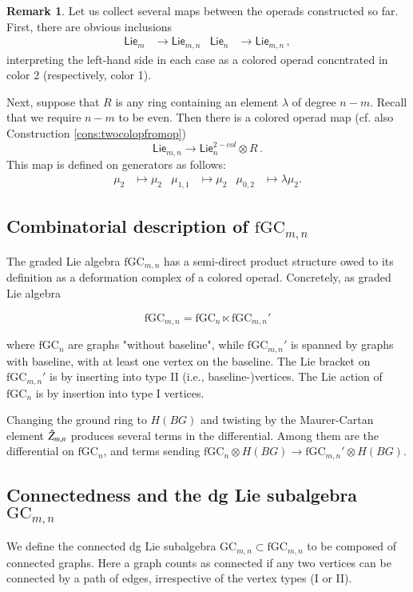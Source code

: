 \documentclass[a4paper]{amsart}
\theoremstyle{plain}
\theoremstyle{definition}
\newtheorem{rem}[thm]{Remark}
\newcommand{\Lie}{\mathsf{Lie}}
\newcommand{\GC}{\mathrm{GC}}
\newcommand{\fGC}{\mathrm{fGC}}
\newcommand{\beq}[1]{
\begin{equation}\label{#1}
}
\newcommand{\eeq}{
\end{equation}
}
\begin{document}
\begin{rem}
 Let us collect several maps between the operads constructed so far.
First, there are obvious inclusions 
\begin{align}\label{equ:Liemninclusions}
 \Lie_m&\to \Lie_{m,n} & \Lie_n&\to \Lie_{m,n}\, ,
\end{align}
interpreting the left-hand side in each case as a colored operad concntrated in color 2 (respectively, color 1).

Next, suppose that $R$ is any ring containing an element $\lambda$ of degree $n-m$. Recall that we require $n-m$ to be even. Then there is a colored operad map (cf. also Construction \ref{cons:twocolopfromop})
\begin{equation}
 \label{equ:Liemn2Lie}
\Lie_{m,n} \to \Lie_n^{2-col} \otimes R \,.
\end{equation}
This map is defined on generators as follows:
\begin{align*}
 \mu_2 &\mapsto \mu_2 
&
\mu_{1,1} &\mapsto \mu_2
&
\mu_{0,2} &\mapsto \lambda \mu_2.
\end{align*}

\end{rem}


\subsection{Combinatorial description of \texorpdfstring{$\fGC_{m,n}$}{fGCmn}}
The graded Lie algebra $\fGC_{m,n}$ has a semi-direct product structure owed to its definition as a deformation complex of a colored operad.
Concretely, as graded Lie algebra
\beq{equ:fsplitting}
\fGC_{m,n} = \fGC_n \ltimes \fGC_{m,n}'
\eeq
where $\fGC_n$ are graphs "without baseline", while $\fGC_{m,n}'$ is spanned by graphs with baseline, with at least one vertex on the baseline.
The Lie bracket on $\fGC_{m,n}'$ is by inserting into type II (i.e., baseline-)vertices. The Lie action of $\fGC_n$ is by insertion into type I vertices.

Changing the ground ring to $H(BG)$ and twisting by the Maurer-Cartan element $\hat Z_{m,n}$ produces several terms in the differential.
Among them are the differential on $\fGC_n$, and terms sending $\fGC_n\otimes H(BG)\to \fGC_{m,n}'\otimes H(BG)$.

\subsection{Connectedness and the dg Lie subalgebra \texorpdfstring{$\GC_{m,n}$}{GCmn} }
We define the connected dg Lie subalgebra $\GC_{m,n}\subset \fGC_{m,n}$ to be composed of connected graphs.
Here a graph counts as connected if any two vertices can be connected by a path of edges, irrespective of the vertex types (I or II).
\end{document}

